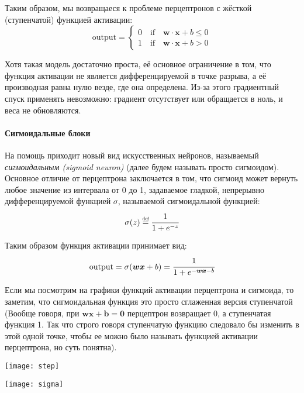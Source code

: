 Таким образом, мы возвращаеся к проблеме перцептронов с жёсткой (ступенчатой) 
функцией активации:
\begin{equation*}
    \text{output} = \begin{cases}
        0 \quad \text{if} \quad \bm{w} \cdot \bm{x} + b \leq 0 \\
        1 \quad \text{if} \quad \bm{w} \cdot \bm{x} + b > 0 
    \end{cases}
\end{equation*}

Хотя такая модель достаточно проста, её основное ограничение в том, 
что функция активации не является дифференцируемой в точке разрыва, 
а её производная равна нулю везде, где она определена. 
Из-за этого градиентный спуск применять невозможно: градиент отсутствует или 
обращается в ноль, и веса не обновляются.

\paragraph{Сигмоидальные блоки}

На помощь приходит новый вид искусственных нейронов, называемый 
\textit{сигмоидальным (sigmoid neuron)} (далее будем называть просто сигмоидом). 
Основное отличие от перцептрона заключается в том, что
сигмоид может вернуть любое значение из интервала от 0 до 1, 
задаваемое гладкой, непрерывно дифференцируемой функцией $\sigma$, 
называемой сигмоидальной функцией:
\begin{equation*}
    \sigma(z) \defeq \cfrac{1}{1 + e^{-z}}
\end{equation*}

Таким образом функция активации принимает вид:
\begin{equation*}
    \text{output} = \sigma(\bm{wx} + b) = \cfrac{1}{1 + e^{-\bm{wx} - b}}
\end{equation*}

Если мы посмотрим на графики функций активации перцептрона и сигмоида, то 
заметим, что сигмоидальная функция это просто сглаженная версия ступенчатой 
(Вообще говоря, при $\bm{wx + b = 0}$ перцептрон возвращает 0, а ступенчатая 
функция 1. Так что строго говоря ступенчатую функцию следовало бы изменить в 
этой одной точке, чтобы ее можно было называть функцией активации перцептрона, но 
суть понятна).

\begin{minipage}{0.4\textwidth}
    \texttt{[image: step]}
    \label{fig:step}
\end{minipage}
\hspace{30pt}
\begin{minipage}{0.4\textwidth}
    \texttt{[image: sigma]}
    \label{fig:sigma}
\end{minipage}\\

